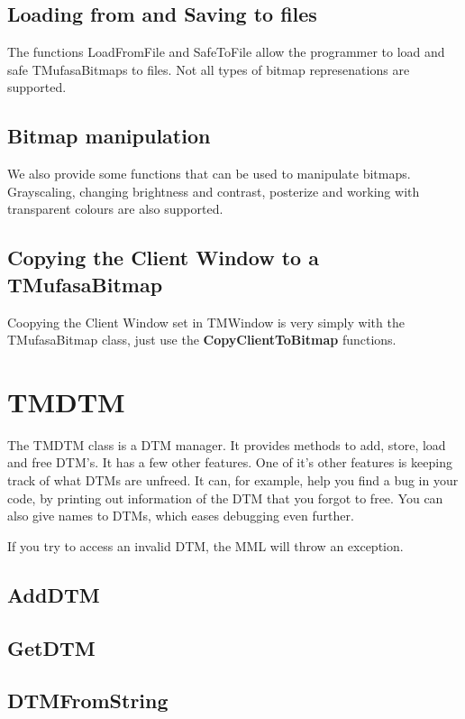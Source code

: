 \documentclass[a4paper]{report}
\begin{document}
\subsection{Loading from and Saving to files}

The functions LoadFromFile and SafeToFile allow the programmer to load and safe
TMufasaBitmaps to files. Not all types of bitmap represenations are supported.


\subsection{Bitmap manipulation}

We also provide some functions that can be used to manipulate bitmaps.
Grayscaling, changing brightness and contrast, posterize and working with
transparent colours are also supported.

\subsection{Copying the Client Window to a TMufasaBitmap}

Coopying the Client Window set in TMWindow is very simply with the TMufasaBitmap
class, just use the \textbf{CopyClientToBitmap} functions.


\section{TMDTM}

The TMDTM class is a DTM manager. It provides methods to add, store, load
and free DTM's. It has a few other features. One of it's other features
is keeping track of what DTMs are unfreed. It can, for example, help you find
a bug in your code, by printing out information of the DTM that you forgot to
free. You can also give names to DTMs, which eases debugging even further.

If you try to access an invalid DTM, the MML will throw an exception.


\subsection{AddDTM}
\subsection{GetDTM}
\subsection{DTMFromString}
\end{document}
